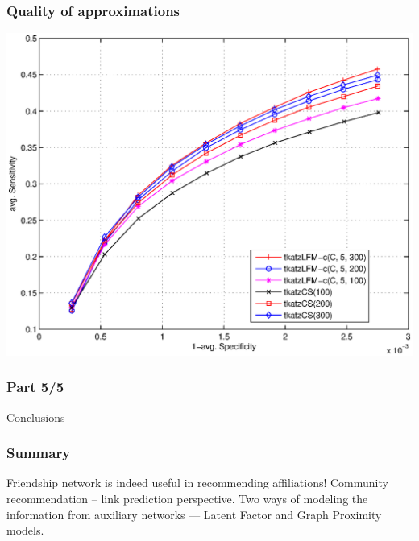 \documentclass{beamer}
\begin{document}

\begin{frame}
\frametitle{Quality of approximations}
\begin{center}
\includegraphics[scale=0.4]{../journalPaper/summaryRankDependencyYoutube.eps}
\end{center}
\end{frame}

\begin{frame}
\frametitle{Part 5/5}
  \hspace{1.1in}
  \centerline{\huge{Conclusions}}
\end{frame}

\begin{frame}
\frametitle{Summary}
\begin{itemize}
\pitem Friendship network is indeed useful in recommending affiliations!
\pitem Community recommendation -- link prediction perspective.
\pitem Two ways of modeling the information from auxiliary networks --- Latent Factor and Graph Proximity models.
\end{itemize}
\end{frame}
\end{document}
